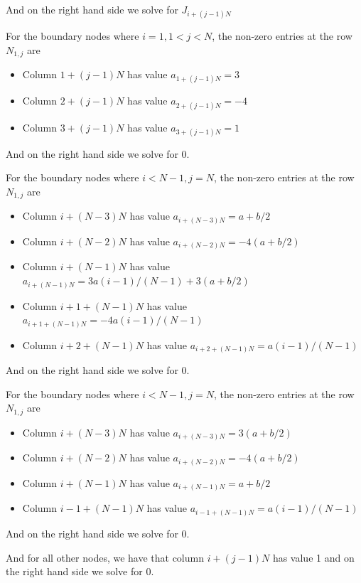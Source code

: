 \begin{enumerate}[label=(\roman*),leftmargin=*,itemsep=0mm]
    And on the right hand side we solve for $J_{i + (j-1)N}$
    
    For the boundary nodes where $i=1, 1 < j < N$, the non-zero entries at the row $N_{1,j}$ are
    \begin{itemize}[noitemsep,nolistsep]
        \item Column $1 + (j-1)N$ has value $a_{1 + (j-1)N} = 3$
        \item Column $2 + (j-1)N$ has value $a_{2 + (j-1)N} = -4$
        \item Column $3 + (j-1)N$ has value $a_{3 + (j-1)N} = 1$
    \end{itemize}
    
    And on the right hand side we solve for 0.
    
    For the boundary nodes where $i < N-1, j = N$, the non-zero entries at the row $N_{1,j}$ are
    \begin{itemize}[noitemsep,nolistsep]
        \item Column $i + (N-3)N$ has value $a_{i + (N-3)N} = a+b/2$
        \item Column $i + (N-2)N$ has value $a_{i + (N-2)N} = -4(a+b/2)$
        \item Column $i + (N-1)N$ has value $a_{i + (N-1)N} = 3a(i-1)/(N-1) + 3(a+b/2)$
        \item Column $i+1 + (N-1)N$ has value $a_{i+1 + (N-1)N} = -4a(i-1)/(N-1)$
        \item Column $i+2 + (N-1)N$ has value $a_{i+2 + (N-1)N} = a(i-1)/(N-1)$
    \end{itemize}
    
    And on the right hand side we solve for 0.
    
    For the boundary nodes where $i < N-1, j = N$, the non-zero entries at the row $N_{1,j}$ are
    \begin{itemize}[noitemsep,nolistsep]
        \item Column $i + (N-3)N$ has value $a_{i + (N-3)N} = 3(a+b/2)$
        \item Column $i + (N-2)N$ has value $a_{i + (N-2)N} = -4(a+b/2)$
        \item Column $i + (N-1)N$ has value $a_{i + (N-1)N} = a+b/2$
        \item Column $i-1 + (N-1)N$ has value $a_{i-1 + (N-1)N} = a(i-1)/(N-1)$
    \end{itemize}
    
    And on the right hand side we solve for 0.
    
    And for all other nodes, we have that column $i + (j-1)N$ has value 1 and on the right hand side we solve for 0.
    

\end{enumerate}
